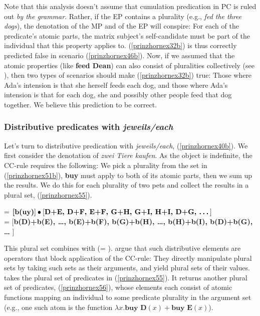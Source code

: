 \documentclass[output=paper]{langscibook}
\begin{document}
Note that this analysis doesn't assume that cumulation predication in PC is ruled out \textit{by the grammar}. Rather, if the EP contains a plurality (e.g., \textit{fed the three dogs}), the denotation of the MP and of the EP will conspire: For each of the predicate's atomic parts,  the matrix subject's self-candidate must be part of the individual that this property applies to. (\ref{prinzhornex32b}) is thus correctly predicted false in scenario (\ref{prinzhornex46b}). Now, if we assumed that the atomic properties (like \textbf{feed Dean}) can also consist of pluralities collectively (see ), then  two types of scenarios should make (\ref{prinzhornex32b}) true: Those where Ada's intension is that she herself feeds each dog, and those where Ada's intension is that for each dog, she and possibly other people feed that dog together. We believe this prediction to be correct.

\subsubsection{Distributive predicates with \textit{jeweils/each}}\label{prinzhornsec:dist}  Let's turn to distributive predication with \textit{jeweils/each}, (\ref{prinzhornex40b}). We first consider the denotation of \textit{zwei Tiere kaufen}. As the object is indefinite, the CC-rule requires the following: We pick a plurality from the set in (\ref{prinzhornex51b}),  \textbf{buy} must apply to both of its atomic parts, then we sum up the results. We do this for each plurality of two pets and collect the results in a plural set, (\ref{prinzhornex55}).

\ea {} = $\textbf[\textbf{b(uy)}] \bullet [ \textbf{D+E, D+F, E+F, G+H, G+I, H+I, D+G,  \dots} ]$\\ = 
$[$\textbf{b(D)+b(E), \dots, b(E)+b(F), b(G)+b(H), \dots, b(H)+b(I), b(D)+b(G), \dots} $]$\label{prinzhornex55} \z

This plural set combines with  (= ). \citet{Haslinger:2018b} argue that such distributive elements are operators that block application of the CC-rule: They directly manipulate plural sets by  taking such sets as their arguments, and  yield plural sets of their values.  takes the plural set of predicates in (\ref{prinzhornex55}). It returns another plural set of predicates, (\ref{prinzhornex56}), whose elements each consist of atomic functions  mapping an individual to some predicate plurality in the argument set (e.g., one such atom is the function $\lambda x.\textbf{buy D}(x)+\textbf{buy E}(x)$).
\end{document}
